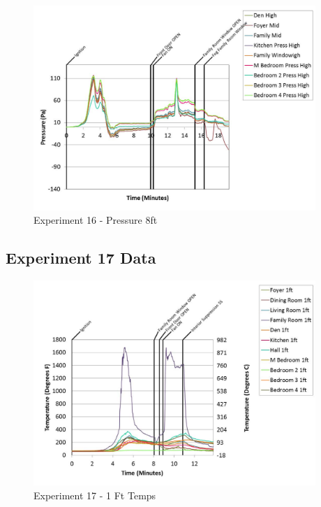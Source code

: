 \documentclass{article}
\begin{document}
\begin{appendices}
	\begin{figure}[h!]
		\centering
		\includegraphics[height=3.05in]{0_Images/Results_Charts/Exp_16_Charts/Pressure8ft.pdf}
		\caption{Experiment 16 - Pressure 8ft}
	\end{figure}
 
	\clearpage

		\clearpage
\clearpage		\large
\subsection{Experiment 17 Data} \label{App:Exp17Results} 

	\begin{figure}[h!]
		\centering
		\includegraphics[height=3.05in]{0_Images/Results_Charts/Exp_17_Charts/1FtTemps.pdf}
		\caption{Experiment 17 - 1 Ft Temps}
	\end{figure}
 


\end{appendices}
\end{document}
